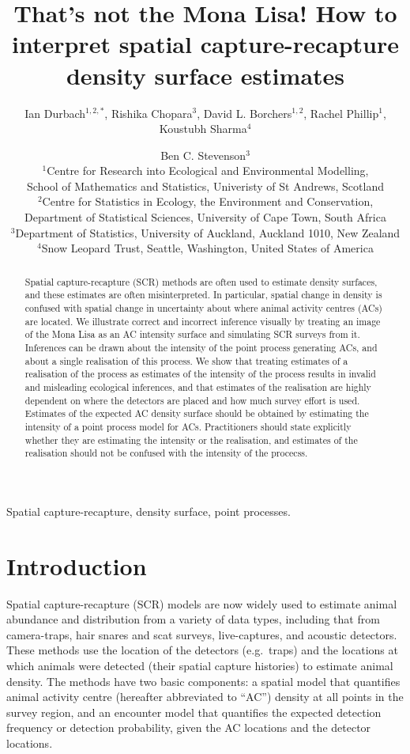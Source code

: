 \documentclass[useAMS,usenatbib,referee]{biom}
\title[How to interpret SCR density surface estimates]{That's not the Mona Lisa! How to interpret spatial capture-recapture density surface estimates}
\author{Ian Durbach$^{1,2,*}$, Rishika Chopara$^{3}$, David L. Borchers$^{1,2}$, Rachel Phillip$^{1}$, Koustubh Sharma$^{4}$ \and Ben C. Stevenson$^{3}$ \\
$^{1}$Centre for Research into Ecological and Environmental Modelling, \\ School of Mathematics and Statistics, Univeristy of St Andrews, Scotland \\
$^{2}$Centre for Statistics in Ecology, the Environment and Conservation, \\ Department of Statistical Sciences, University of Cape Town, South Africa \\
$^{3}$Department of Statistics, University of Auckland, Auckland 1010, New Zealand \\
$^{4}$Snow Leopard Trust, Seattle, Washington, United States of America \\
\email{indurbach@gmail.com}}
\begin{document}
\begin{abstract}
Spatial capture-recapture (SCR) methods are often used to estimate density surfaces, and these estimates are often misinterpreted. In particular, spatial change in density is confused with spatial change in uncertainty about where animal activity centres (ACs) are located. We illustrate correct and incorrect inference visually by treating an image of the Mona Lisa as an AC intensity surface and simulating SCR surveys from it. Inferences can be drawn about the intensity of the point process generating ACs, and about a single realisation of this process. We show that treating estimates of a realisation of the process as estimates of the intensity of the process results in invalid and misleading ecological inferences, and that estimates of the realisation are highly dependent on where the detectors are placed and how much survey effort is used. Estimates of the expected AC density surface should be obtained by estimating the intensity of a point process model for ACs. Practitioners should state explicitly whether they are estimating the intensity or the realisation, and estimates of the realisation should not be confused with the intensity of the procecss.
\end{abstract}

\begin{keywords}
Spatial capture-recapture, density surface, point processes.
\end{keywords}

\maketitle 

\section{Introduction}

Spatial capture-recapture (SCR) models \citep*{Efford:04,Borchers+Efford:08, Royle+Young:08} are now widely used to estimate animal abundance and distribution from a variety of data types, including that from camera-traps, hair snares and scat surveys, live-captures, and acoustic detectors. These methods use the location of the detectors (e.g.\ traps) and the locations at which animals were detected (their spatial capture histories) to estimate animal density. The methods have two basic components: a spatial model that quantifies animal activity centre (hereafter abbreviated to ``AC'') density at all points in the survey region, and an encounter model that quantifies the expected detection frequency or detection probability, given the AC locations and the detector locations. 
\end{document}
